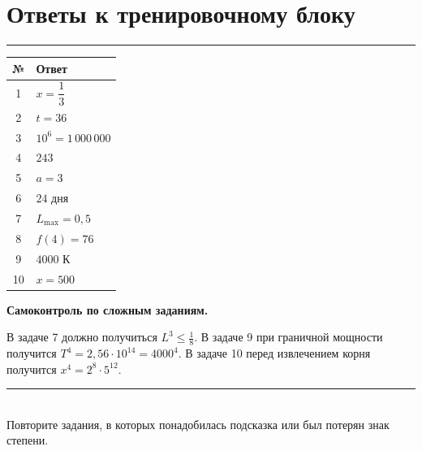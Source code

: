 \documentclass[a4paper,12pt]{article}
\newcommand{\sectionline}{\par\vspace{2pt}\noindent\textcolor{accent}{\rule{\linewidth}{0.5pt}}\par\vspace{3pt}}
\begin{document}
\section*{Ответы к тренировочному блоку}
\sectionline
\renewcommand{\arraystretch}{1.55}
\begin{center}
\begin{tabularx}{0.88\linewidth}{@{}cX@{}}
\toprule
\textbf{№} & \textbf{Ответ} \\
\midrule
1 & \(x=\dfrac13\) \\
2 & \(t=36\) \\
3 & \(10^6=1\,000\,000\) \\
4 & \(243\) \\
5 & \(a=3\) \\
6 & \(24\) дня \\
7 & \(L_{\max}=0{,}5\) \\
8 & \(f(4)=76\) \\
9 & \(4000\) К \\
10 & \(x=500\) \\
\bottomrule
\end{tabularx}
\end{center}
\vspace{9mm}
\textbf{Самоконтроль по сложным заданиям.}

В задаче 7 должно получиться \(L^3\le\frac18\). В задаче 9 при граничной мощности получится \(T^4=2{,}56\cdot10^{14}=4000^4\). В задаче 10 перед извлечением корня получится \(x^4=2^8\cdot5^{12}\).

\vfill
\begin{center}
\textcolor{darkaccent}{\rule{.5\linewidth}{.5pt}}\\[6pt]
\small Повторите задания, в которых понадобилась подсказка или был потерян знак степени.
\end{center}
\end{document}
